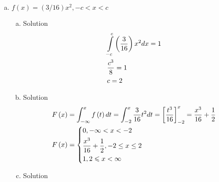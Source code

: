 \documentclass{article}
\begin{document}
\begin{spacing}{1.1}
\begin{homeworkProblem}
\begin{enumerate}[(a)]
\begin{enumerate}[(a)]
\begin{homeworkSection}{Solution}
			
					\end{homeworkSection}
			\end{enumerate}				
		\item $f(x) = (3/16)x^2, -c < x < c$
			\begin{enumerate}[(a)]
				\item
					\begin{homeworkSection}{Solution}
						\[\begin{gathered}
						  \int\limits_{ - c}^c {\left( {\frac{3}{{16}}} \right){x^2}dx}  = 1 \hfill \\
						  \frac{{{c^3}}}{8} = 1 \hfill \\
						  c = 2 \hfill \\ 
						\end{gathered} \]
					\end{homeworkSection}
				\item
					\begin{homeworkSection}{Solution}
						\[\begin{gathered}
						  F\left( x \right) = \int_{ - \infty }^x {f\left( t \right)dt}  = \int_{ - 2}^x {\frac{3}{{16}}{t^2}dt}  = \left[ {\frac{{{t^3}}}{{16}}} \right]_{ - 2}^x = \frac{{{x^3}}}{{16}} + \frac{1}{2} \hfill \\
						  F\left( x \right) = \left\{ \begin{gathered}
						  0, - \infty  < x <  - 2 \hfill \\
						  \frac{{{x^3}}}{{16}} + \frac{1}{2}, - 2 \le x \le 2 \hfill \\
						  1,2 \leqslant x < \infty  \hfill \\ 
						\end{gathered}  \right. \hfill \\ 
						\end{gathered} \]
					\end{homeworkSection}
				\item
					\begin{homeworkSection}{Solution}
		

\end{homeworkSection}
\end{enumerate}
\end{enumerate}
\end{homeworkProblem}
\end{spacing}
\end{document}
